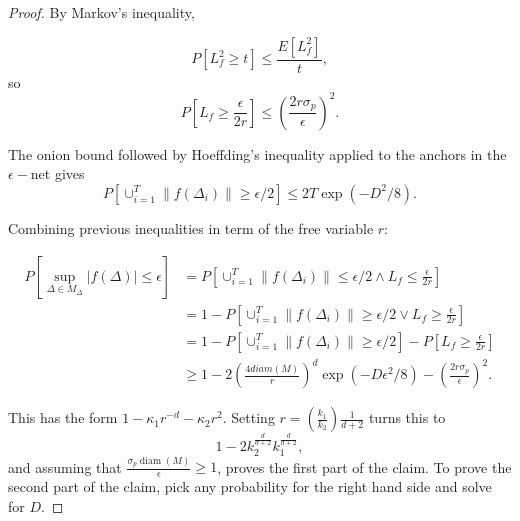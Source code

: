\begin{proof}
By Markov's inequality, 

\begin{equation}
    P \left[
        L_f^2 \geq t
    \right]
    \leq 
    \frac{E[L_f^2]}{t}, 
\end{equation}
so 
\begin{equation}
    P
    \left[
        L_f
        \geq 
        \frac{\epsilon}{2r}
    \right]
    \leq 
    \left(
        \frac{2 r \sigma_p}{\epsilon}
    \right)^2.
\end{equation}

The onion bound followed by Hoeffding's 
inequality applied to the anchors in the 
$\epsilon-$net gives 
\begin{equation}
    P\left[
       \cup^T_{i = 1} 
       \|f(\Delta_i)\| 
       \geq \epsilon / 2
    \right]
    \leq 2T
    \exp\left(-D^2/8\right).
\end{equation}

Combining previous inequalities in term of the free variable $r$: 

\begin{align}
    P\left[
        \sup_{\Delta \in M_\Delta}
        |f(\Delta)| 
        \leq \epsilon
    \right]
    & =  
    P\left[
        \cup^T_{i = 1} 
       \|f(\Delta_i)\| 
       \leq \epsilon / 2
       \wedge
       L_f \leq \frac{\epsilon}{2 r}
    \right]
    \\ 
    & = 
    1 - 
    P\left[
        \cup^T_{i = 1} 
       \|f(\Delta_i)\| 
       \geq \epsilon / 2
       \vee
       L_f \geq \frac{\epsilon}{2 r}
    \right]
    \\ 
    & = 
    1 - 
    P\left[
        \cup^T_{i = 1} 
       \|f(\Delta_i)\| 
       \geq \epsilon / 2
       \right]
       - 
       P\left[
       L_f \geq \frac{\epsilon}{2 r}
    \right]
    \\ & 
    \geq 
    1 -2 \left(
        \frac{4 diam(M)}{r}
    \right)^d
    \exp(-D \epsilon^2/8)
    - \left(
        \frac{2 r \sigma_p}{\epsilon}
    \right)^2.
\end{align}

This has the form $1-\kappa_1 r^{-d}-\kappa_2 r^2$. 
Setting
 $r=\left( \frac{k_1}{k_2}\right)\frac{1}{d+2}$ 
 turns this to
 \begin{equation}
    1 - 
    2 k_2^{\frac{d}{d+2}}
    k_1^{\frac{d}{d+2}}, 
 \end{equation}
and assuming that $\frac{\sigma_p \operatorname{diam}(M)}{\epsilon} \geq 1$, proves the first part of the claim. To prove the second part of the claim, pick any probability for the right hand side and solve for $D$.

\end{proof}

